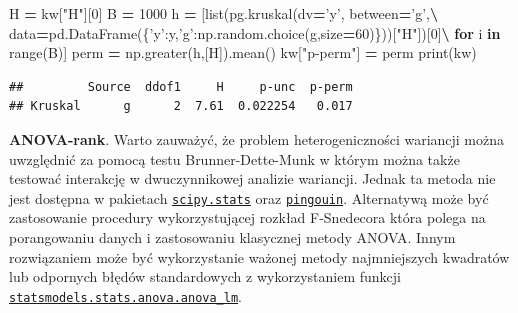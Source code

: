 \documentclass[polish,]{book}
\newenvironment{Shaded}{\begin{snugshade}}{\end{snugshade}}
\newcommand{\BuiltInTok}[1]{#1}
\newcommand{\ControlFlowTok}[1]{\textcolor[rgb]{0.13,0.29,0.53}{\textbf{#1}}}
\newcommand{\DecValTok}[1]{\textcolor[rgb]{0.00,0.00,0.81}{#1}}
\newcommand{\KeywordTok}[1]{\textcolor[rgb]{0.13,0.29,0.53}{\textbf{#1}}}
\newcommand{\NormalTok}[1]{#1}
\newcommand{\OperatorTok}[1]{\textcolor[rgb]{0.81,0.36,0.00}{\textbf{#1}}}
\newcommand{\StringTok}[1]{\textcolor[rgb]{0.31,0.60,0.02}{#1}}
\begin{document}
\begin{Shaded}
\begin{Highlighting}[]
\NormalTok{H }\OperatorTok{=}\NormalTok{ kw[}\StringTok{"H"}\NormalTok{][}\DecValTok{0}\NormalTok{]}
\NormalTok{B }\OperatorTok{=} \DecValTok{1000}
\NormalTok{h }\OperatorTok{=}\NormalTok{ [}\BuiltInTok{list}\NormalTok{(pg.kruskal(dv}\OperatorTok{=}\StringTok{'y'}\NormalTok{, between}\OperatorTok{=}\StringTok{'g'}\NormalTok{,}\OperatorTok{\textbackslash{}}
\NormalTok{          data}\OperatorTok{=}\NormalTok{pd.DataFrame(\{}\StringTok{'y'}\NormalTok{:y,}\StringTok{'g'}\NormalTok{:np.random.choice(g,size}\OperatorTok{=}\DecValTok{60}\NormalTok{)\}))[}\StringTok{"H"}\NormalTok{])[}\DecValTok{0}\NormalTok{]}\OperatorTok{\textbackslash{}}
          \ControlFlowTok{for}\NormalTok{ i }\KeywordTok{in} \BuiltInTok{range}\NormalTok{(B)]}
\NormalTok{perm }\OperatorTok{=}\NormalTok{ np.greater(h,[H]).mean()}
\NormalTok{kw[}\StringTok{"p-perm"}\NormalTok{] }\OperatorTok{=}\NormalTok{ perm}
\BuiltInTok{print}\NormalTok{(kw)}
\end{Highlighting}
\end{Shaded}

\begin{verbatim}
##         Source  ddof1     H     p-unc  p-perm
## Kruskal      g      2  7.61  0.022254   0.017
\end{verbatim}

\textbf{ANOVA-rank}. Warto zauważyć, że problem heterogeniczności wariancji można uwzględnić za pomocą testu Brunner-Dette-Munk \citep{BDM1997} w którym można także testować interakcję w dwuczynnikowej analizie wariancji. Jednak ta metoda nie jest dostępna w pakietach \href{https://docs.scipy.org/doc/scipy/reference/stats.html}{\texttt{scipy.stats}} oraz \href{https://pingouin-stats.org/index.html}{\texttt{pingouin}}. Alternatywą może być zastosowanie procedury wykorzystującej rozkład F-Snedecora która polega na porangowaniu danych i zastosowaniu klasycznej metody ANOVA. Innym rozwiązaniem może być wykorzystanie ważonej metody najmniejszych kwadratów lub odpornych błędów standardowych z wykorzystaniem funkcji \href{https://www.statsmodels.org/stable/generated/statsmodels.stats.anova.anova_lm.html\#statsmodels.stats.anova.anova_lm}{\texttt{statsmodels.stats.anova.anova\_lm}}.
\end{document}
